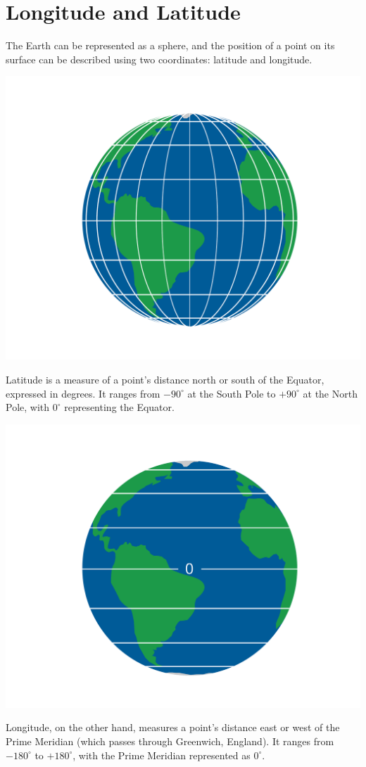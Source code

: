 \chapter{Longitude and Latitude}


The Earth can be represented as a sphere, and the position of a point
on its surface can be described using two coordinates: latitude and
longitude. 

\includegraphics[width=.75\textwidth]{latLon.png}


Latitude is a measure of a point's distance north or south of the
Equator, expressed in degrees. It ranges from $-90^{\circ}$ at the
South Pole to $+90^{\circ}$ at the North Pole, with $0^{\circ}$
representing the Equator.

\includegraphics[width=.75\textwidth]{lat.png}

Longitude, on the other hand, measures a point's distance east or west
of the Prime Meridian (which passes through Greenwich, England). It
ranges from $-180^{\circ}$ to $+180^{\circ}$, with the Prime Meridian
represented as $0^{\circ}$.

